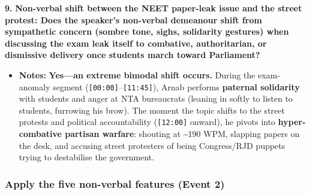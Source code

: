 \documentclass[10pt,a4paper]{article}
\begin{document}
\noindent\textbf{9.} \textbf{Non-verbal shift between the NEET paper-leak issue and the street protest: Does the speaker's non-verbal demeanour shift from sympathetic concern (sombre tone, sighs, solidarity gestures) when discussing the exam leak itself to combative, authoritarian, or dismissive delivery once students march toward Parliament?}\par\smallskip
\begin{itemize}
  \item \textbf{Notes:}
\textbf{Yes---an extreme bimodal shift occurs.} During the exam-anomaly segment (\texttt{[00:00]}--\texttt{[11:45]}), Arnab performs \textbf{paternal solidarity} with students and anger at NTA bureaucrats (leaning in softly to listen to students, furrowing his brow). The moment the topic shifts to the street protests and political accountability (\texttt{[12:00]} onward), he pivots into \textbf{hyper-combative partisan warfare}: shouting at \textasciitilde{}190 WPM, slapping papers on the desk, and accusing street protesters of being Congress/RJD puppets trying to destabilise the government.\par\smallskip
\end{itemize}

\subsubsection*{Apply the five non-verbal features (Event 2)}
\end{document}
